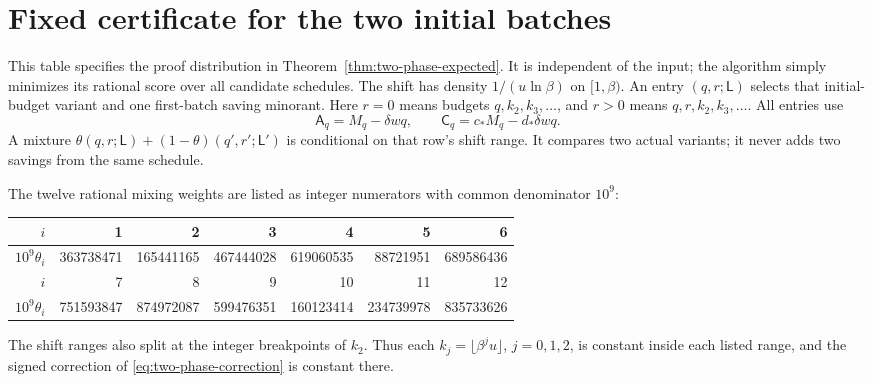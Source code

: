 \section{Fixed certificate for the two initial batches}
\label{sec:two-phase-certificate}

This table specifies the proof distribution in
Theorem~\ref{thm:two-phase-expected}. It is independent of the input;
the algorithm simply minimizes its rational score over all candidate
schedules. The shift has density $1/(u\ln\beta)$ on $[1,\beta)$.
An entry $(q,r;\mathsf L)$ selects that initial-budget variant and
one first-batch saving minorant. Here $r=0$ means budgets
$q,k_2,k_3,\ldots$, and $r>0$ means
$q,r,k_2,k_3,\ldots$. All entries use
\[
 \mathsf A_q=M_q-\delta wq,\qquad
 \mathsf C_q=c_*M_q-d_*\delta wq.
\]
A mixture $\theta(q,r;\mathsf L)+(1-\theta)(q',r';\mathsf L')$
is conditional on that row's shift range. It compares two actual
variants; it never adds two savings from the same schedule.

The twelve rational mixing weights are listed as integer numerators
with common denominator $10^9$:
\begin{center}
\small
\begin{tabular}{r|rrrrrr}
$i$ &1&2&3&4&5&6\\\hline
$10^9\theta_i$ &
363738471&165441165&467444028&619060535&88721951&689586436\\
$i$ &7&8&9&10&11&12\\\hline
$10^9\theta_i$ &751593847&874972087&599476351&160123414&234739978&835733626\\
\end{tabular}
\end{center}
The shift ranges also split at the integer breakpoints of $k_2$.
Thus each $k_j=\lfloor\beta^j u\rfloor$, $j=0,1,2$, is constant
inside each listed range, and the signed correction of
\eqref{eq:two-phase-correction} is constant there.

